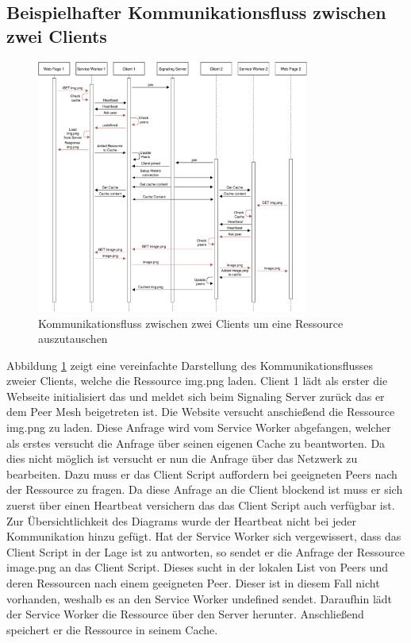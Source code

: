 \begin{description}
\subsection{Beispielhafter Kommunikationsfluss zwischen zwei Clients}
\begin{figure}[!h]
	\centering
	\includegraphics[width=0.8\textwidth]{figures/message_flow_cdn}
	\caption[A Figure Short-Title]{Kommunikationsfluss zwischen zwei Clients um eine Ressource auszutauschen}
	\label{fig:message_flow_cdn}
\end{figure}

Abbildung \ref{fig:message_flow_cdn} zeigt eine vereinfachte Darstellung des Kommunikationsflusses zweier Clients, welche die Ressource img.png laden. Client 1 lädt als erster die Webseite initialisiert das \cdn und meldet sich beim Signaling Server zurück das er dem Peer Mesh beigetreten ist. Die Website versucht anschießend die Ressource img.png zu laden. Diese Anfrage wird vom Service Worker abgefangen, welcher als erstes versucht die Anfrage über seinen eigenen Cache zu beantworten. Da dies nicht möglich ist versucht er nun die Anfrage über das \pTp Netzwerk zu bearbeiten. Dazu muss er das Client Script auffordern bei geeigneten Peers nach der Ressource zu fragen. Da diese Anfrage an die Client blockend ist muss er sich zuerst über einen Heartbeat versichern das das Client Script auch verfügbar ist. Zur Übersichtlichkeit des Diagrams wurde der Heartbeat nicht bei jeder Kommunikation hinzu gefügt. Hat der Service Worker sich vergewissert, dass das Client Script in der Lage ist zu antworten, so sendet er die Anfrage der Ressource image.png an das Client Script. Dieses sucht in der lokalen List von Peers und deren Ressourcen nach einem geeigneten Peer. Dieser ist in diesem Fall nicht vorhanden, weshalb es an den Service Worker undefined sendet. Daraufhin lädt der Service Worker die Ressource über den Server herunter. Anschließend speichert er die Ressource in seinem Cache.


\end{description}
